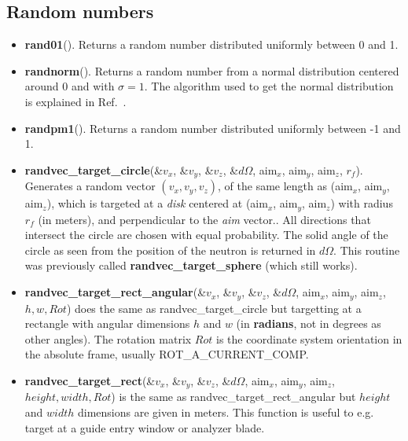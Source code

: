 \subsection{Random numbers}
\begin{itemize}
\item {\bf rand01}(). Returns a random number distributed uniformly between 0 and 1.
\item {\bf randnorm}(). Returns a random number from a normal
  distribution centered around 0 and with $\sigma=1$. The algorithm used to
  get the normal distribution is explained in Ref.~\cite[ch.7]{num_rep}.
\item {\bf randpm1}(). Returns a random number distributed uniformly between -1 and 1.
\item {\bf randvec\_target\_circle}(\&$v_x$, \&$v_y$, \&$v_z$, \&$d\Omega$,
  aim$_x$, aim$_y$, aim$_z$, $r_f$). Generates a random vector $(v_x, v_y,
  v_z)$, of the same length as (aim$_x$, aim$_y$, aim$_z$), which is
  targeted at a \emph{disk} centered at (aim$_x$, aim$_y$, aim$_z$) with
  radius $r_f$ (in meters), and perpendicular to the \emph{aim} vector.. All directions
  that intersect the circle are chosen with equal probability. The solid
  angle of the circle as seen from the position of the neutron is returned
  in $d\Omega$. This routine was previously called {\bf randvec\_target\_sphere}
  (which still works).
\item {\bf randvec\_target\_rect\_angular}(\&$v_x$, \&$v_y$, \&$v_z$,
  \&$d\Omega$, aim$_x$, aim$_y$, aim$_z$,$h, w, Rot$) does the same as
  randvec\_target\_circle but targetting at a rectangle with angular dimensions
  $h$ and $w$ (in {\bf radians}, not in degrees as other angles). The
  rotation matrix $Rot$ is the coordinate system orientation in the absolute
  frame, usually ROT\_A\_CURRENT\_COMP.
\item {\bf randvec\_target\_rect}(\&$v_x$, \&$v_y$, \&$v_z$,
  \&$d\Omega$, aim$_x$, aim$_y$, aim$_z$,$height, width, Rot$) is the same as
  randvec\_target\_rect\_angular but $height$ and $width$ dimensions are given
  in meters. This function is useful to e.g. target at a guide entry window
  or analyzer blade.
\end{itemize}

